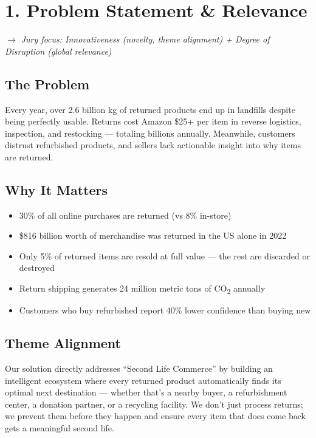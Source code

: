 \documentclass[11pt,a4paper]{article}
\begin{document}
\section{1. Problem Statement \& Relevance}
{\small\itshape $\rightarrow$ Jury focus: Innovativeness (novelty, theme alignment) + Degree of Disruption (global relevance)}

\subsection{The Problem}
Every year, over 2.6 billion kg of returned products end up in landfills despite being perfectly usable. Returns cost Amazon \$25+ per item in reverse logistics, inspection, and restocking --- totaling billions annually. Meanwhile, customers distrust refurbished products, and sellers lack actionable insight into why items are returned.

\subsection{Why It Matters}
\begin{itemize}[noitemsep]
\item 30\% of all online purchases are returned (vs 8\% in-store)
\item \$816 billion worth of merchandise was returned in the US alone in 2022
\item Only 5\% of returned items are resold at full value --- the rest are discarded or destroyed
\item Return shipping generates 24 million metric tons of CO\textsubscript{2} annually
\item Customers who buy refurbished report 40\% lower confidence than buying new
\end{itemize}

\subsection{Theme Alignment}
Our solution directly addresses ``Second Life Commerce'' by building an intelligent ecosystem where every returned product automatically finds its optimal next destination --- whether that's a nearby buyer, a refurbishment center, a donation partner, or a recycling facility. We don't just process returns; we prevent them before they happen and ensure every item that does come back gets a meaningful second life.
\end{document}
